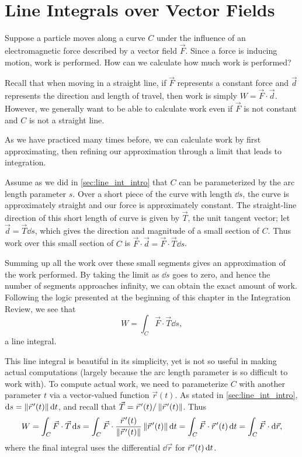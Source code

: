 \section{Line Integrals over Vector Fields}\label{sec:line_int_vf}

Suppose a particle moves along a curve $C$ under the influence of an electromagnetic force described by a vector field $\vec F$. Since a force is inducing motion, work is performed. How can we calculate how much work is performed?

Recall that when moving in a straight line, if $\vec F$ represents a constant force and $\vec d$ represents the direction and length of travel, then work is simply $W = \vec F\cdot \vec d$. However, we generally want to be able to calculate work even if $\vec F$ is not constant and $C$ is not a straight line.

As we have practiced many times before, we can calculate work by first approximating, then refining our approximation through a limit that leads to integration. 

Assume as we did in \autoref{sec:line_int_intro} that $C$ can be parameterized by the arc length parameter $s$. Over a short piece of the curve with length $\dd s$, the curve is approximately straight and our force is approximately constant. The straight-line direction of this short length of curve is given by $\vec T$, the unit tangent vector;   let $\vec d = \vec T\dd s$, which gives  the direction and magnitude of a small section of $C$. Thus work over this small section of $C$ is $\vec F \cdot \vec d = \vec F\cdot \vec T\dd s$. 

Summing up all the work over these small segments gives an approximation of the work performed. By taking the limit as $\dd s$ goes to zero, and hence the number of segments approaches infinity, we can obtain the exact amount of work. Following the logic presented at the beginning of this chapter in the Integration Review, we see that 
\[W = \int_C \vec F\cdot \vec T\dd s,\]
a line integral.

This line integral is beautiful in its simplicity, yet is not so useful in making actual computations (largely because the arc length parameter is so difficult to work with). To compute actual work, we need to parameterize $C$ with another parameter  $t$ via a vector-valued function $\vec r(t)$. As stated in \autoref{sec:line_int_intro}, $\operatorname{d}\! s = \left\lVert \vec r\hskip1.25pt '(t) \right\rVert\operatorname{d}\! t$, and recall that $\vec T = \vec r\hskip1.25pt '(t)/\left\lVert \vec r\hskip1.25pt '(t) \right\rVert$. Thus
\begin{equation}
W = \int_C \vec F\cdot\vec T\operatorname{d}\! s
= \int_C \vec F\cdot \frac{\vec r\hskip1.25pt '(t)}{\left\lVert \vec r\hskip1.25pt '(t) \right\rVert}\left\lVert \vec r\hskip1.25pt '(t) \right\rVert\operatorname{d}\! t
= \int_C\vec F\cdot \vec r\hskip1.25pt '(t)\operatorname{d}\! t = \int_C \vec F\cdot\operatorname{d}\!\vec r,
\label{eq:line_integral}
\end{equation}
where the final integral uses the differential $\dd\vec r$ for $\vec r\hskip1.25pt '(t)\operatorname{d}\! t$.

